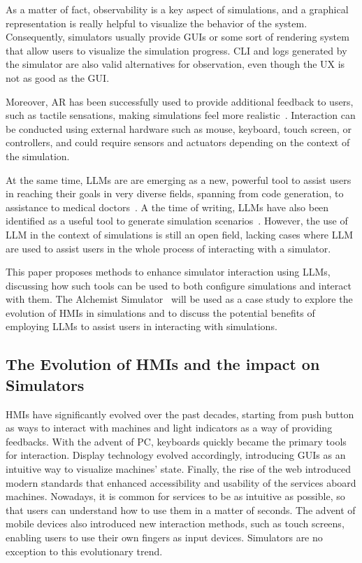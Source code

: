\documentclass[conference]{IEEEtran}
\begin{document}
As a matter of fact,
observability is a key aspect of simulations,
and a graphical representation is really helpful to visualize the behavior of the system.
%
Consequently,
simulators usually provide \acp{GUI} or some sort of rendering system that allow users to visualize the simulation progress.
%
\ac{CLI} and logs generated by the simulator are also valid alternatives for observation,
even though the \ac{UX} is not as good as the \ac{GUI}.

Moreover,
\ac{AR} has been successfully used to provide additional feedback to users,
such as tactile sensations,
making simulations feel more realistic~\cite{Jud2020}.
%
Interaction can be conducted using external hardware such as mouse, keyboard, touch screen, or controllers,
and could require sensors and actuators depending on the context of the simulation.

At the same time,
\ac{LLM}s are are emerging as a new,
powerful tool to assist users in reaching their goals in very diverse fields,
spanning from code generation,
to assistance to medical doctors~\cite{Wu2024}.
%
A the time of writing,
\acp{LLM} have also been identified as a useful tool to generate simulation scenarios~\cite{Zhang2023}.
%
However,
the use of \ac{LLM} in the context of simulations is still an open field,
lacking cases where \ac{LLM} are used to assist users in the whole process of interacting with a simulator.

This paper proposes methods to enhance simulator interaction using \acp{LLM},
discussing how such tools can be used to both configure simulations and interact with them.
%
The Alchemist Simulator~\cite{Pianini_2013} will be used as a case study to explore the evolution of \acp{HMI} in simulations and to discuss the potential benefits of employing \acp{LLM} to assist users in interacting with simulations.

\subsection{The Evolution of \acp{HMI} and the impact on Simulators}

\acp{HMI} have significantly evolved over the past decades,
starting from push button as ways to interact with machines and light indicators as a way of providing feedbacks.
%
With the advent of \ac{PC},
keyboards quickly became the primary tools for interaction.
%
Display technology evolved accordingly,
introducing \acp{GUI} as an intuitive way to visualize machines' state.
%
Finally,
the rise of the web introduced modern standards that enhanced accessibility and usability of the services aboard machines.
%
Nowadays,
it is common for services to be as intuitive as possible,
so that users can understand how to use them in a matter of seconds.
%
The advent of mobile devices also introduced new interaction methods,
such as touch screens,
enabling users to use their own fingers as input devices.
%
Simulators are no exception to this evolutionary trend.
%
\end{document}
